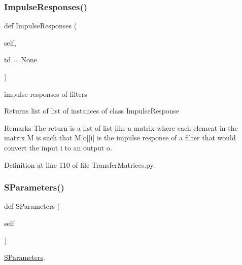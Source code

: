 \subsubsection{\texorpdfstring{Impulse\+Responses()}{ImpulseResponses()}}
{\footnotesize\ttfamily def Impulse\+Responses (\begin{DoxyParamCaption}\item[{}]{self,  }\item[{}]{td = {\ttfamily None} }\end{DoxyParamCaption})}



impulse responses of filters 

\begin{DoxyReturn}{Returns}
list of list of instances of class Impulse\+Response 
\end{DoxyReturn}
\begin{DoxyRemark}{Remarks}
The return is a list of list like a matrix where each element in the matrix M is such that M\mbox{[}o\mbox{]}\mbox{[}i\mbox{]} is the impulse response of a filter that would convert the input i to an output o. 
\end{DoxyRemark}


Definition at line 110 of file Transfer\+Matrices.\+py.

\mbox{\label{classSignalIntegrity_1_1FrequencyDomain_1_1TransferMatrices_1_1TransferMatrices_a5624dc56319957b00db2c962426e225e}} 
\subsubsection{\texorpdfstring{S\+Parameters()}{SParameters()}}
{\footnotesize\ttfamily def S\+Parameters (\begin{DoxyParamCaption}\item[{}]{self }\end{DoxyParamCaption})}



\hyperlink{namespaceSignalIntegrity_1_1SParameters}{S\+Parameters}. 

